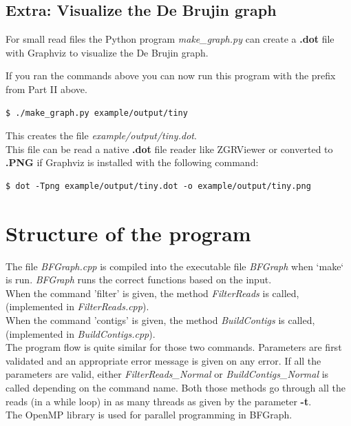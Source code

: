 \documentclass[a4paper]{report}
\renewcommand{\b}[1]{\textbf{#1}}  %
\renewcommand{\i}[1]{\textit{#1}}  %
\newcommand{\e}[1]{\emph{#1}}    %
\begin{document}
\section{Extra: Visualize the De Brujin graph}
For small read files the Python program \e{make\_graph.py} can create a \b{.dot} file with Graphviz\cite{graphviz} 
to visualize the De Brujin graph.

If you ran the commands above you can now run this program with the prefix from Part II above.
\begin{verbatim}
$ ./make_graph.py example/output/tiny
\end{verbatim}

This creates the file \e{example/output/tiny.dot}.\\[4pt]

This file can be read a native \b{.dot} file reader like ZGRViewer\cite{zgr} or converted to \b{.PNG} if Graphviz is installed with the following command:
\begin{verbatim}
$ dot -Tpng example/output/tiny.dot -o example/output/tiny.png
\end{verbatim}







\chapter{Structure of the program}
The file \e{BFGraph.cpp} is compiled into the executable file \e{BFGraph} when `make` is run. 
\e{BFGraph} runs the correct functions based on the input.\\[4pt]
When the command 'filter' is given, the method \i{FilterReads} is called, (implemented in \e{FilterReads.cpp}).\\
When the command 'contigs' is given, the method \i{BuildContigs} is called, (implemented in \e{BuildContigs.cpp}).\\

The program flow is quite similar for those two commands. Parameters are first validated and an appropriate error message is given
on any error. If all the parameters are valid, either \i{FilterReads\_Normal} or \i{BuildContigs\_Normal} is called depending
on the command name. Both those methods go through all the reads (in a while loop) in as many threads as given by the parameter \b{-t}.\\[4pt]

The OpenMP\cite{openmp} library is used for parallel programming in BFGraph.\\[4pt] 
\end{document}
